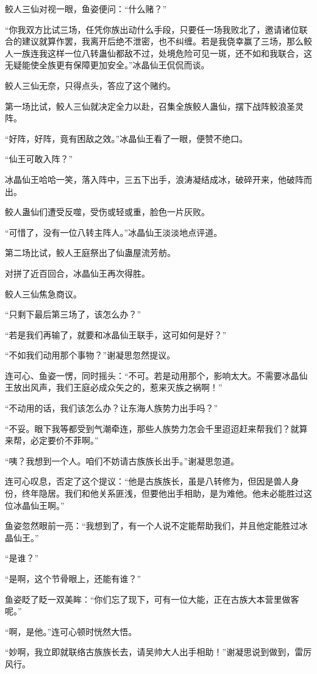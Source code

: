 \begin{this_body}
鲛人三仙对视一眼，鱼姿便问：“什么赌？”

“你我双方比试三场，任凭你族出动什么手段，只要任一场我败北了，邀请诸位联合的建议就算作罢，我离开后绝不泄密，也不纠缠。若是我侥幸赢了三场，那么鲛人一族连我这样一位八转蛊仙都敌不过，处境危险可见一斑，还不如和我联合，这无疑能使全族更有保障更加安全。”冰晶仙王侃侃而谈。

鲛人三仙无奈，只得点头，答应了这个赌约。

第一场比试，鲛人三仙就决定全力以赴，召集全族鲛人蛊仙，摆下战阵鲛浪圣灵阵。

“好阵，好阵，竟有困敌之效。”冰晶仙王看了一眼，便赞不绝口。

“仙王可敢入阵？”

冰晶仙王哈哈一笑，落入阵中，三五下出手，浪涛凝结成冰，破碎开来，他破阵而出。

鲛人蛊仙们遭受反噬，受伤或轻或重，脸色一片灰败。

“可惜了，没有一位八转主阵人。”冰晶仙王淡淡地点评道。

第二场比试，鲛人王庭祭出了仙蛊屋流芳舫。

对拼了近百回合，冰晶仙王再次得胜。

鲛人三仙焦急商议。

“只剩下最后第三场了，该怎么办？”

“若是我们再输了，就要和冰晶仙王联手，这可如何是好？”

“不如我们动用那个事物？”谢凝思忽然提议。

连可心、鱼姿一愣，同时摇头：“不可。若是动用那个，影响太大。不需要冰晶仙王放出风声，我们王庭必成众矢之的，惹来灭族之祸啊！”

“不动用的话，我们该怎么办？让东海人族势力出手吗？”

“不妥。眼下我等都受到气潮牵连，那些人族势力怎会千里迢迢赶来帮我们？就算来帮，必定要价不菲啊。”

“咦？我想到一个人。咱们不妨请古族族长出手。”谢凝思忽道。

连可心叹息，否定了这个提议：“他是古族族长，虽是八转修为，但因是兽人身份，终年隐居。我们和他关系匪浅，但要他出手相助，是为难他。他未必能胜过这位冰晶仙王啊。”

鱼姿忽然眼前一亮：“我想到了，有一个人说不定能帮助我们，并且他定能胜过冰晶仙王。”

“是谁？”

“是啊，这个节骨眼上，还能有谁？”

鱼姿眨了眨一双美眸：“你们忘了现下，可有一位大能，正在古族大本营里做客呢。”

“啊，是他。”连可心顿时恍然大悟。

“妙啊，我立即就联络古族族长去，请吴帅大人出手相助！”谢凝思说到做到，雷厉风行。

\end{this_body}

